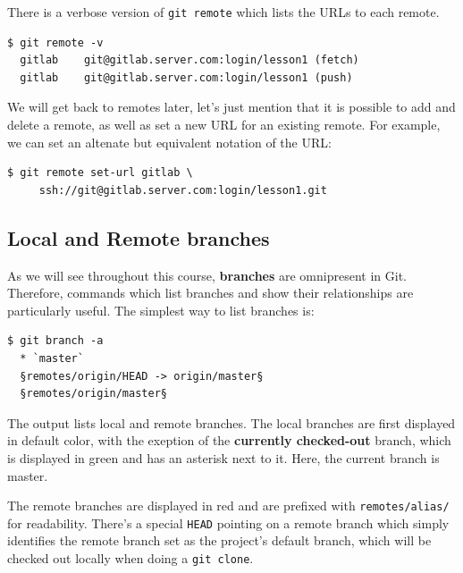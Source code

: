 \documentclass{../common/tufte-latex/tufte-handout}
\begin{document}
There is a verbose version of \texttt{git remote} which lists the URLs to each remote.

\begin{lstlisting}[style=BashInputStyle]
  $ git remote -v
  gitlab	git@gitlab.server.com:login/lesson1 (fetch)
  gitlab	git@gitlab.server.com:login/lesson1 (push)
\end{lstlisting}

We will get back to remotes later, let's just mention that it is possible to add and delete a remote, as well as set a new URL for an existing remote.
For example, we can set an altenate but equivalent notation of the URL:


\begin{lstlisting}[style=BashInputStyle]
  $ git remote set-url gitlab \
     ssh://git@gitlab.server.com:login/lesson1.git
\end{lstlisting}

\subsection{Local and Remote branches}

As we will see throughout this course, \textbf{branches} are omnipresent in Git.
Therefore, commands which list branches and show their relationships are particularly useful.
The simplest way to list branches is:


\begin{lstlisting}[style=BashInputStyle]
  $ git branch -a
  * `master`
  §remotes/origin/HEAD -> origin/master§
  §remotes/origin/master§
\end{lstlisting}

The output lists local and remote branches.
The local branches are first displayed in default color, with the exeption of the \textbf{currently checked-out} branch, which is displayed in green and has an asterisk next to it.
Here, the current branch is master.

The remote branches are displayed in red and are prefixed with \texttt{remotes/alias/} for readability.
There's a special \texttt{HEAD} pointing on a remote branch which simply identifies the remote branch set as the project's default branch, which will be checked out locally when doing a \texttt{git clone}.
\end{document}
